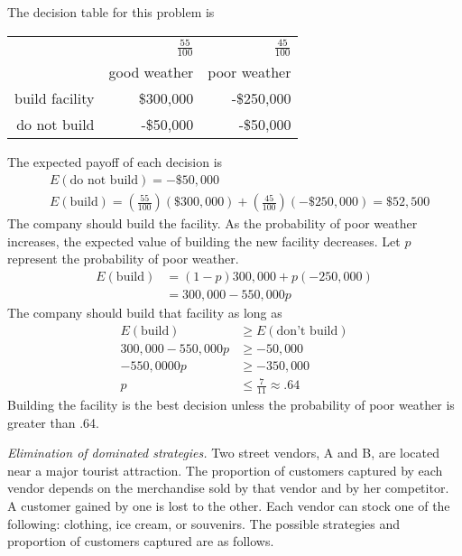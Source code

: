 \begin{solution}
	\bs The decision table for this problem is
	\begin{center}
		\begin{tabular}{rrr}
			& $\frac{55}{100}$ & $\frac{45}{100}$ \\
			& good weather & poor weather \\ \hline
			build facility & \$300,000 & -\$250,000 \\
			do not build & -\$50,000 & -\$50,000
		\end{tabular}
	\end{center}

The expected payoff of each decision is
\begin{align*}
&E(\text{do not build}) = -\$50,000 \\
&E(\text{build}) = \left(\frac{55}{100}\right)(\$300,000)
+ \left(\frac{45}{100}\right)(-\$250,000) = \$52,500
\end{align*}
The company should build the facility. As the probability of poor weather increases, the expected value of building the new facility decreases. 
Let $p$ represent the probability of poor weather.
\begin{align*}
E(\text{build}) &= (1-p)300,000 + p(-250,000) \\
&= 300,000 - 550,000p
\end{align*}
The company should build that facility as long as
\begin{align*}
E(\text{build}) &\geq E(\text{don't build}) \\
300,000 - 550,000p &\geq -50,000 \\
-550,0000p &\geq -350,000 \\
p &\leq \frac{7}{11} \approx .64
\end{align*}
Building the facility is the best decision unless the probability of poor weather is greater than .64.	

\end{solution}

\item \emph{Elimination of dominated strategies.}
Two street vendors, A and B, are located near a major tourist attraction. 
The proportion of customers
captured by each vendor depends on the merchandise sold by that vendor and by
her competitor. A customer gained by one is lost to the other. Each vendor
can stock one of the following: clothing, ice cream, or souvenirs.
The possible strategies and proportion of customers captured are as follows.

